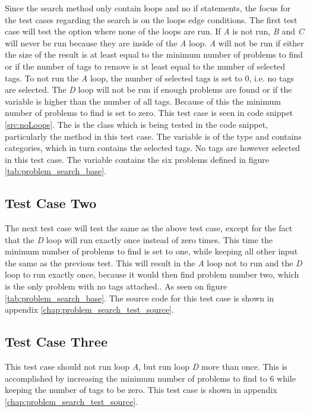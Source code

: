 Since the search method only contain loops and no if statements, the focus for the test cases regarding the search is on the loops edge conditions.
The first test case will test the option where none of the loops are run.
If \textit{A} is not run, \textit{B} and \textit{C} will never be run because they are inside of the \textit{A} loop.
\textit{A} will not be run if either the size of the result is at least equal to the minimum number of problems to find or if the number of tags to remove is at least equal to the number of selected tags.
To not run the \textit{A} loop, the number of selected tags is set to 0, i.e. no tags are selected.
The \textit{D} loop will not be run if enough problems are found or if the  variable is higher than the number of all tags.
Because of this the minimum number of problems to find is set to zero.
This test case is seen in code snippet \ref{src:noLoops}.
The  is the class which is being tested in the code snippet, particularly the  method in this test case.
The variable  is of the type  and contains categories, which in turn contains the selected tags.
No tags are however selected in this test case.
The  variable contains the six problems defined in figure \ref{tab:problem_search_base}.

\subsection{Test Case Two}
The next test case will test the same as the above test case, except for the fact that the \textit{D} loop will run exactly once instead of zero times.
This time the minimum number of problems to find is set to one, while keeping all other input the same as the previous test.
This will result in the \textit{A} loop not to run and the \textit{D} loop to run exactly once, because it would then find problem number two, which is the only problem with no tags attached.. As seen on figure \ref{tab:problem_search_base}.
The source code for this test case is shown in appendix \ref{chap:problem_search_test_source}.

\subsection{Test Case Three}
This test case should not run loop \textit{A}, but run loop \textit{D} more than once.
This is accomplished by increasing the minimum number of problems to find to 6 while keeping the number of tags to be zero.
This test case is shown in appendix \ref{chap:problem_search_test_source}.

